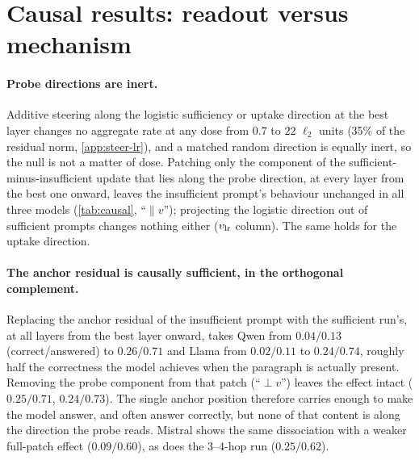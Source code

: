\section{Causal results: readout versus mechanism}
\label{sec:causal}

\begin{table}[t]
\centering\scriptsize
\setlength{\tabcolsep}{3pt}

\caption{Causal tests, 150 held-out questions, all layers from the best sufficiency layer onward. Left: insufficient prompt with its anchor residual patched (correct / answered). Right: sufficient prompt with the component along a direction set to its insufficient-state value (answered). $\vdm$: mean-difference direction; $\vlr$: logistic-probe direction.}
\label{tab:causal}
\end{table}

\paragraph{Probe directions are inert.}
Additive steering along the logistic sufficiency or uptake direction at the best layer changes no aggregate rate at any dose from $0.7$ to $22$ $\ell_2$ units (35\% of the residual norm, \cref{app:steer-lr}), and a matched random direction is equally inert, so the null is not a matter of dose. Patching only the component of the sufficient-minus-insufficient update that lies along the probe direction, at every layer from the best one onward, leaves the insufficient prompt's behaviour unchanged in all three models (\cref{tab:causal}, ``$\parallel v$''); projecting the logistic direction out of sufficient prompts changes nothing either ($\vlr$ column). The same holds for the uptake direction.

\paragraph{The anchor residual is causally sufficient, in the orthogonal complement.}
Replacing the anchor residual of the insufficient prompt with the sufficient run's, at all layers from the best layer onward, takes Qwen from $0.04/0.13$ (correct/answered) to $0.26/0.71$ and Llama from $0.02/0.11$ to $0.24/0.74$, roughly half the correctness the model achieves when the paragraph is actually present. Removing the probe component from that patch (``$\perp v$'') leaves the effect intact ($0.25/0.71$, $0.24/0.73$). The single anchor position therefore carries enough to make the model answer, and often answer correctly, but none of that content is along the direction the probe reads. Mistral shows the same dissociation with a weaker full-patch effect ($0.09/0.60$), as does the 3--4-hop run ($0.25/0.62$).

